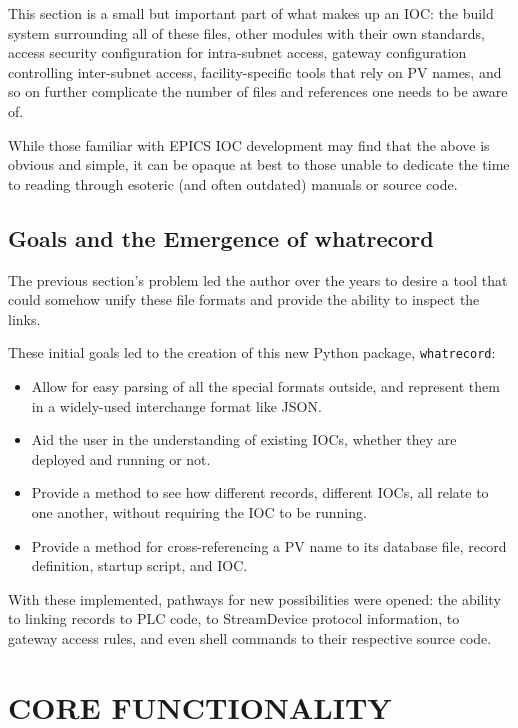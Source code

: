 \documentclass[letter,
               keeplastbox,   %
               ]{jacow}
\begin{document}
This section is a small but important part of what makes up an IOC: the build
system surrounding all of these files, other modules with their own standards,
access security configuration for intra-subnet access, gateway configuration
controlling inter-subnet access, facility-specific tools that rely on PV
names, and so on further complicate the number of files and references
one needs to be aware of.

While those familiar with EPICS IOC development may find that the above is
obvious and simple, it can be opaque at best to those unable to dedicate the
time to reading through esoteric (and often outdated) manuals or source
code.

\subsection{Goals and the Emergence of whatrecord}

The previous section's problem led the author over the years to desire a tool
that could somehow unify these file formats and provide the ability to inspect
the links.

These initial goals led to the creation of this new Python package,
\verb_whatrecord_\cite{whatrecord-github}:
\begin{itemize}
  \item Allow for easy parsing of all the special formats outside, and
    represent them in a widely-used interchange format like JSON.
  \item Aid the user in the understanding of existing IOCs, whether they are
    deployed and running or not.
  \item Provide a method to see how different records, different IOCs, all
    relate to one another, without requiring the IOC to be running.
  \item Provide a method for cross-referencing a PV name to its database
    file, record definition, startup script, and IOC.
\end{itemize}

With these implemented, pathways for new possibilities were opened: the ability
to linking records to PLC code, to StreamDevice protocol information, to
gateway access rules, and even shell commands to their respective source code.

\section{CORE FUNCTIONALITY}
\end{document}
